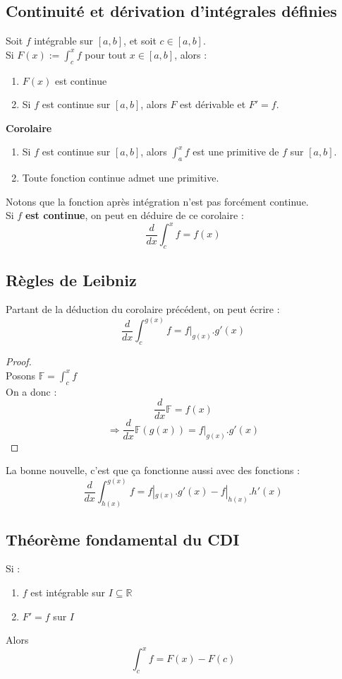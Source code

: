 \documentclass[11pt, a4paper, openany]{book}
\begin{document}
\subsection{Continuité et dérivation d'intégrales définies}
Soit $f$ intégrable sur $[a,b]$, et soit $c \in [a,b]$.\\
Si $F(x) := \int_c^x f$ pour tout $x \in [a,b]$, alors :
\begin{enumerate}
	\item $F(x)$ est continue
	\item Si $f$ est continue sur $[a,b]$, alors $F$ est dérivable et $F' = f$.
\end{enumerate}
\textbf{Corolaire}
\begin{enumerate}
	\item Si $f$ est continue sur $[a,b]$, alors $\int_a^x f$ est une primitive de $f$ sur $[a,b]$.
	\item Toute fonction continue admet une primitive.
\end{enumerate}
Notons que la fonction après intégration n'est pas forcément continue.\\

Si $f$ \textbf{est continue}, on peut en déduire de ce corolaire : 
$$\frac{d}{dx}\int_c^x f = f(x)$$

\subsection{Règles de Leibniz}
Partant de la déduction du corolaire précédent, on peut écrire : 
$$\frac{d}{dx}\int_c^{g(x)} f = f|_{g(x)}.g'(x)$$

\begin{proof}
	\ \\ Posons $\mathbb{F} = \int_c^x f$\\
	On a donc : 
	$$\frac{d}{dx}\mathbb{F} = f(x)$$
	$$\Rightarrow \frac{d}{dx}\mathbb{F}(g(x)) = f|_{g(x)}.g'(x)$$
\end{proof}
La bonne nouvelle, c'est que ça fonctionne aussi avec des fonctions : 
$$\frac{d}{dx}\int_{h(x)}^{g(x)} f = f|_{g(x)}.g'(x) - f|_{h(x)}.h'(x)$$

\subsection{Théorème fondamental du CDI}
Si : 
\begin{enumerate}
	\item $f$ est intégrable sur $I \subseteq \mathbb{R}$
	\item $F' = f$ sur $I$
\end{enumerate}
Alors 
$$\int^x_c f = F(x) - F(c)$$
\end{document}
